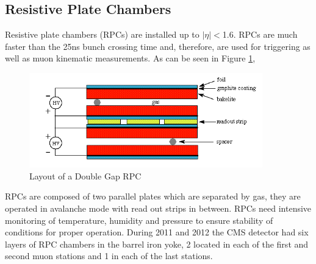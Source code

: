 \subsection{Resistive Plate Chambers}
Resistive plate chambers (RPCs) are installed up to $|\eta|<$1.6. 
RPCs are much faster than the 25ns bunch crossing time and, therefore,
are used for triggering as well as muon kinematic measurements. 
As can be seen in Figure \ref{fig:RPCsketch},
\begin{figure}[hb]
  \centering
	\includegraphics[width=0.9\textwidth]{images/RPCsketch.png}
  	\caption[RPC Sketch]
   	{Layout of a Double Gap RPC}
	\label{fig:RPCsketch}
\end{figure}
RPCs are composed
of two parallel plates which are separated by gas, they are operated in avalanche 
mode with read out strips in between. 
RPCs need intensive monitoring of temperature, humidity and pressure to ensure stability
of conditions for proper operation.
During 2011 and 2012 the CMS detector had six layers of RPC chambers in the barrel iron yoke,
2 located in each of the first and second muon stations and 1 in each of the last stations.
